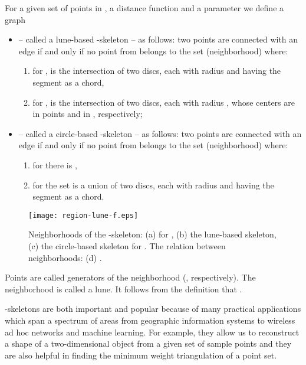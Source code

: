 \documentclass[11pt]{llncs}
\begin{document}
\begin{definition} 
\label{betaskeleton}
For a given set of points   in , a distance 
function   and a parameter  we define a graph 
\begin{itemize}
\item
 -- called a lune-based -skeleton \cite{kr85} -- as follows:  
two points  are connected with an edge if and only if no point 
from  belongs to the set 
 (neighborhood) where:

\begin{enumerate} 
\item 
for ,  is the intersection of two discs, 
each with radius  and having the segment 
as a chord,
\item 
for ,  is the intersection of two  
discs, each with radius , whose centers are in points 
 and 
in , respectively;
\end{enumerate}

\item
 -- called a circle-based -skeleton \cite{e02} -- as follows:  
two points  are connected with an edge if and only if no point 
from  belongs to the set 
 (neighborhood) where:
\begin{enumerate}
\item
for  there is , 
\item
for  the set  is a union of two discs, 
each with radius  and having the segment 
as a chord.
\end{enumerate}
\end{itemize}

\end{definition}

\begin{figure}[htbp]
\centering
\texttt{[image: region-lune-f.eps]}
\caption{Neighborhoods of the -skeleton: (a) for  , (b) the lune-based 
skeleton, (c) the circle-based skeleton for . The relation between 
neighborhoods: (d) .}
\label{fig:region}
\end{figure}



Points  are called generators of the neighborhood 
(, respectively).
 The neighborhood  is called a lune. 
It follows from the definition that .
 
-skeletons are both important and popular because of many practical applications 
which span a spectrum of areas from geographic information systems to wireless ad hoc 
networks and machine learning. 
For example, they allow us to reconstruct a shape of a two-dimensional object from 
a given set of sample points and they are also helpful in finding the minimum 
weight triangulation of a point set. 
\end{document}
